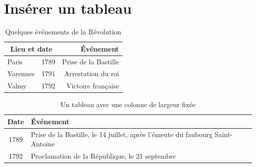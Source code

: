 \documentclass[12pt]{article}
\begin{document}
\section{Insérer un tableau}

\lipsum[1]


\begin{table}[ht]
	\centering
	\begin{tabular}{|l|c|r|}
		\hline
		\multicolumn{2}{|c|}{Lieu et date} & Événement \\
		\hline
		Paris & 1789 & Prise de la Bastille \\
		\hline
		Varennes & 1791 & Arrestation du roi \\
		\hline
		Valmy & 1792 & Victoire française \\%
		\hline
	\end{tabular}
	\caption{Quelques événements de la Révolution}
\end{table}

\lipsum[2]


\begin{table}[ht]
	\centering
	\begin{tabular}{|c|>{\raggedright\arraybackslash}p{6cm}|}
		\hline
		Date & Événement \\
		\hline
		1789 & Prise de la Bastille, le 14 juillet, après l'émeute du faubourg Saint-Antoine \\
		\hline
		1792 & Proclamation de la République, le 21 septembre \\
		\hline
	\end{tabular}
	\caption{Un tableau avec une colonne de largeur fixée}
\end{table}

\listoftables
\end{document}
